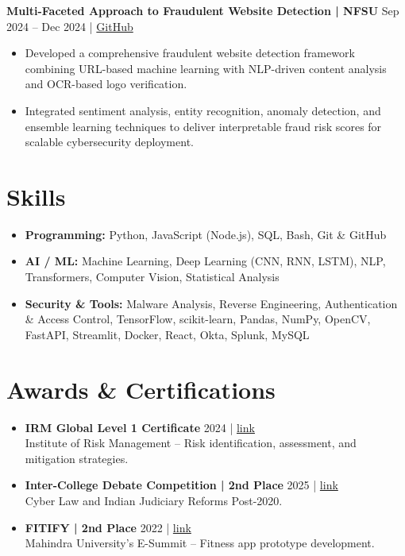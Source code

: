 \documentclass[a4paper,10pt]{article}
\begin{document}
\textbf{Multi-Faceted Approach to Fraudulent Website Detection | NFSU} \hfill Sep 2024 -- Dec 2024 |
\href{https://github.com/MIHIR-RANJAN/A_Multi_Faceted_Approach_to_Fraudulent_Website_Detection.git}{GitHub}
\begin{itemize}[leftmargin=*]
\item Developed a comprehensive fraudulent website detection framework combining URL-based machine learning with NLP-driven content analysis and OCR-based logo verification.
\item Integrated sentiment analysis, entity recognition, anomaly detection, and ensemble learning techniques to deliver interpretable fraud risk scores for scalable cybersecurity deployment.
\end{itemize}



\section{\textbf{Skills}}
\begin{itemize}[leftmargin=*]
\item \textbf{Programming:} Python, JavaScript (Node.js), SQL, Bash, Git \& GitHub
\item \textbf{AI / ML:} Machine Learning, Deep Learning (CNN, RNN, LSTM), NLP, Transformers, Computer Vision, Statistical Analysis
\item \textbf{Security \& Tools:} Malware Analysis, Reverse Engineering, Authentication \& Access Control, TensorFlow, scikit-learn, Pandas, NumPy, OpenCV, FastAPI, Streamlit, Docker, React, Okta, Splunk, MySQL
\end{itemize}


\section{\textbf{Awards \& Certifications}}
\begin{itemize}[leftmargin=*]
\item \textbf{IRM Global Level 1 Certificate} \hfill 2024 |
\href{https://drive.google.com/file/d/1bQqinD-PEgxwXxF4pJlvSC022TX1KDnj/view?usp=sharing}{link} \\
Institute of Risk Management – Risk identification, assessment, and mitigation strategies.

\item \textbf{Inter-College Debate Competition | 2nd Place} \hfill 2025 |
\href{https://drive.google.com/file/d/11uASYH2UqavtXNcwyxmgaJoMjOUqwSY0/view?usp=sharing}{link} \\
Cyber Law and Indian Judiciary Reforms Post-2020.

\item \textbf{FITIFY | 2nd Place} \hfill 2022 |
\href{https://drive.google.com/file/d/15pDKqMnI5vn3K-LuLI3v0hInWTLnmQs-/view?usp=sharing}{link} \\
Mahindra University’s E-Summit – Fitness app prototype development.
\end{itemize}
\end{document}
